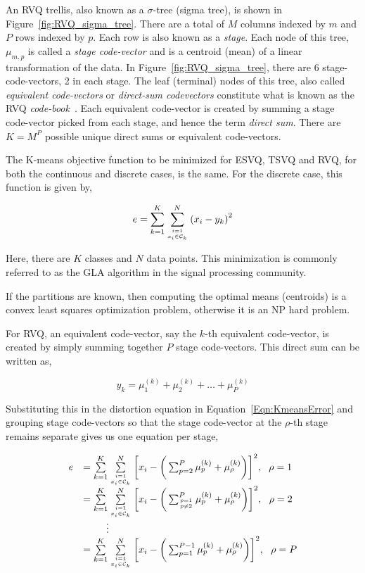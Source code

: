 \documentclass{article}
\begin{document}
An RVQ trellis, also known as a $\sigma$-tree (sigma tree), is shown in Figure~\ref{fig:RVQ_sigma_tree}.  There are a total of $M$ columns indexed by $m$ and $P$ rows indexed by $p$.  Each row is also known as a \emph{stage}.  Each node of this tree, $\mu_{m,p}$ is called a \emph{stage code-vector} and is a centroid (mean) of a linear transformation of the data.  In Figure~\ref{fig:RVQ_sigma_tree}, there are 6 stage-code-vectors, 2 in each stage.  The leaf (terminal) nodes of this tree, also called \emph{equivalent code-vectors} or \emph{direct-sum codevectors} constitute what is known as the RVQ \emph{code-book}~\cite{2007_JNL_IDDM_Barnes}.  Each equivalent code-vector is created by summing a stage code-vector picked from each stage, and hence the term \emph{direct sum}.  There are $K=M^P$ possible unique direct sums or equivalent code-vectors.

The K-means objective function to be minimized for ESVQ, TSVQ and RVQ, for both the continuous and discrete cases, is the same.  For the discrete case, this function is given by,

\begin{equation}
e = \sum\limits_{k=1}^K \sum\limits_{{i=1 \atop x_i \in \mathcal{C}_k}}^N {(x_i - y_k)}^2
\label{Eqn:KmeansError}
\end{equation}

Here, there are $K$ classes and $N$ data points.  This minimization is commonly referred to as the GLA algorithm in the signal processing community.

If the partitions are known, then computing the optimal means (centroids) is a convex least squares optimization problem, otherwise it is an NP hard problem.

For RVQ, an equivalent code-vector, say the $k$-th equivalent code-vector, is created by simply summing together $P$ stage code-vectors.  This direct sum can be written as,

\begin{equation}
y_k = \mu_1^{(k)} + \mu_2^{(k)} + \ldots + \mu_P^{(k)}
\end{equation}

Substituting this in the distortion equation in Equation~\ref{Eqn:KmeansError} and grouping stage code-vectors so that the stage code-vector at the $\rho$-th stage remains separate gives us one equation per stage,
 
\begin{equation}
\begin{array}{llll}
e&= \sum\limits_{k=1}^K \sum\limits_{{i=1 \atop x_i \in \mathcal{C}_k}}^N{\bigg[x_i -\bigg(\sum_{p=2}^P\mu^{(k)}_p+ \mu^{(k)}_\rho\bigg)\bigg]}^2, \ \ \rho=1\\
&= \sum\limits_{k=1}^K \sum\limits_{{i=1 \atop x_i \in \mathcal{C}_k}}^N{\bigg[x_i -\bigg(\sum_{p=1 \atop p \neq 2}^P\mu^{(k)}_p+ \mu^{(k)}_\rho\bigg)\bigg]}^2, \ \ \rho=2\\
&\ \ \ \  \ \ \ \vdots\notag\\
&=\sum\limits_{k=1}^K \sum\limits_{{i=1 \atop x_i \in \mathcal{C}_k}}^N{\bigg[x_i -\bigg(\sum_{p=1}^{P-1}\mu^{(k)}_p+ \mu^{(k)}_\rho\bigg)\bigg]}^2, \ \ \rho=P 
\end{array}
\label{eqn:RVQ_Kmeans_2}
\end{equation}
\end{document}
